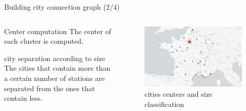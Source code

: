 \begin{frame}{Building city connection graph (2/4)}
    \begin{columns}
        \begin{column}{0.4\textwidth}
            \begin{block}{Center computation}
                The center of each cluster is computed.
            \end{block}

            \begin{block}{city separation according to size}
                The cities that contain more than a certain number of stations are separated from the ones that contain less.
            \end{block}
        \end{column}
        \begin{column}{0.6\textwidth}
            \begin{figure}
                \includegraphics[width=0.5\paperwidth]{images/road_detection/city_clustering_with_centers.png}
                \caption{cities centers and size classification}
            \end{figure}
        \end{column}
    \end{columns}        
\end{frame}


